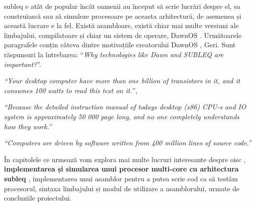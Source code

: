 \documentclass[../main.tex]{subfiles}
\begin{document}
\acrshort{subleq} e atât de popular încât oamenii au început să scrie lucrări despre el, sa construiască sau să simuleze procesoare
pe aceasta arhitectură, de asemenea și această lucrare e la fel. Există asambloare, există chiar mai multe versiuni ale
limbajului, compilatoare și chiar un sistem de operare, DawnOS \cite{dawn}. Următoarele paragrafele conțin câteva dintre 
motivațiile creatorului DawnOS \cite{dawn}, Geri. Sunt răspunsuri la întrebarea:
``\emph{Why technologies like Dawn and SUBLEQ are important?}''.

\emph{``Your desktop computer have more than one billion of transistors in it, and it consumes 100 watts to read this text on it.}'',

\emph{``Because the detailed instruction manual of todays desktop (x86) CPU-s and IO system is approximately 50 000 page long, and no one completely understands how they work.}''

\emph{``Computers are driven by software written from 400 million lines of source code.''}

În capitolele ce urmează vom explora mai multe lucruri interesante despre \acrshort{oisc} \cite{oisc}, \textbf{implementarea și
simularea unui procesor multi-core cu arhitectura \acrshort{subleq} \cite{subleq}}, implementarea unui asamblor pentru a putea
scrie cod ca să testăm procesorul, sintaxa limbajului și modul de utilizare a asamblorului, urmate de concluziile proiectului.
\end{document}
